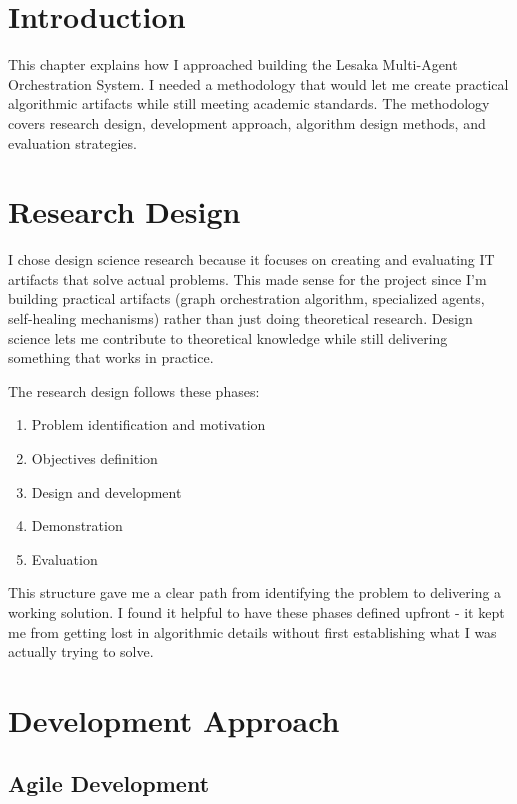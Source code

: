 
\section{Introduction}

This chapter explains how I approached building the Lesaka Multi-Agent Orchestration System. I needed a methodology that would let me create practical algorithmic artifacts while still meeting academic standards. The methodology covers research design, development approach, algorithm design methods, and evaluation strategies.

\section{Research Design}

I chose design science research \cite{hevner2004design} because it focuses on creating and evaluating IT artifacts that solve actual problems. This made sense for the project since I'm building practical artifacts (graph orchestration algorithm, specialized agents, self-healing mechanisms) rather than just doing theoretical research. Design science lets me contribute to theoretical knowledge while still delivering something that works in practice.

The research design follows these phases:

\begin{enumerate}
    \item Problem identification and motivation
    \item Objectives definition
    \item Design and development
    \item Demonstration
    \item Evaluation
\end{enumerate}

This structure gave me a clear path from identifying the problem to delivering a working solution. I found it helpful to have these phases defined upfront - it kept me from getting lost in algorithmic details without first establishing what I was actually trying to solve.

\section{Development Approach}

\subsection{Agile Development}

